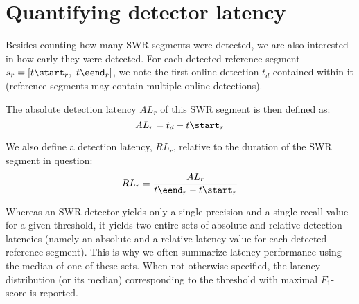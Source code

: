 \section{Quantifying detector latency}

Besides counting how many SWR segments were detected, we are also interested in how early they were detected. For each detected reference segment $s_r = [ t\start_r,\ t\eend_r ]$, we note the first online detection $t_d$ contained within it (reference segments may contain multiple online detections).

The absolute detection latency $AL_r$ of this SWR segment is then defined as:
\begin{equation}
AL_r = t_d - t\start_r 
\end{equation}

We also define a detection latency, $RL_r$, relative to the duration of the SWR segment in question:
\begin{equation}
RL_r = \frac{AL_r}{t\eend_r - t\start_r} 
\end{equation}

Whereas an SWR detector yields only a single precision and a single recall value for a given threshold, it yields two entire sets of absolute and relative detection latencies (namely an absolute and a relative latency value for each detected reference segment). This is why we often summarize latency performance using the median of one of these sets. When not otherwise specified, the latency distribution (or its median) corresponding to the threshold with maximal $F_1$-score is reported.
